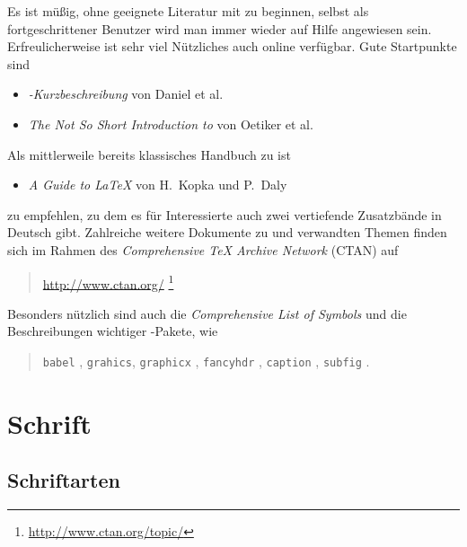 Es ist müßig, ohne geeignete Literatur mit \latex zu beginnen, selbst
als fortgeschrittener Benutzer wird man immer wieder auf Hilfe angewiesen
sein. Erfreulicherweise ist sehr viel Nützliches auch online verfügbar.
Gute Startpunkte sind \zB
%
\begin{itemize}
\item \emph{{\rm\LaTeXe}-Kurzbeschreibung} von Daniel et al.\ \cite{Daniel2012}
\item \emph{The Not So Short Introduction to {\rm \LaTeXe}}
            von Oetiker et al.\ \cite{Oetiker2014}
\end{itemize}
%
\noindent
Als mittlerweile bereits klassisches Handbuch zu \latex ist
%
\begin{itemize}
  \item \emph{A Guide to {\rm\LaTeX}} von H.~Kopka und P.~Daly \cite{Kopka2003}
\end{itemize}
%
zu empfehlen, zu dem es für Interessierte auch zwei vertiefende
Zusatzbände in Deutsch gibt. Zahlreiche weitere Dokumente zu
\latex und verwandten Themen finden sich \ua im Rahmen des {\em
Comprehensive TeX Archive Network} (CTAN) auf
\begin{quote}
	\url{http://www.ctan.org/}%
	\footnote{\url{http://www.ctan.org/topic/}}
\end{quote}
%
Besonders nützlich sind auch die
\emph{Comprehensive List of {\rm \latex} Symbols} \cite{Pakin2009}
und die Beschreibungen wichtiger \latex-Pakete, wie
%
\begin{quote}
	\texttt{babel} \cite{Bezos2014},\newline
  \texttt{grahics}, \texttt{graphicx} \cite{Carlisle2014},\newline
  \texttt{fancyhdr} \cite{Oostrum2004},\newline
  \texttt{caption} \cite{Sommerfeldt2011},\newline
  \texttt{subfig} \cite{Cochran05}.
\end{quote}





\section{Schrift}

\subsection{Schriftarten}

